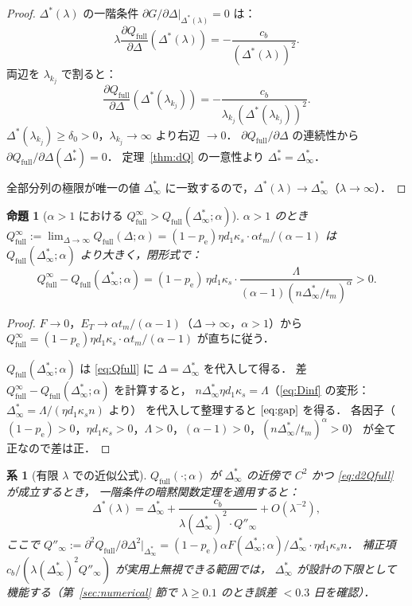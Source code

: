 \documentclass[12pt,a4paper]{article}
\theoremstyle{plain}
\newtheorem{proposition}[theorem]{命題}
\newtheorem{corollary}[theorem]{系}
\theoremstyle{definition}
\theoremstyle{remark}
\newcommand{\pe}{p_{\mathrm{e}}}
\newcommand{\Qf}{Q_{\mathrm{full}}}
\newcommand{\Dopt}{\Delta^{*}}
\newcommand{\Dinf}{\Delta^{*}_{\infty}}
\newcommand{\La}{\Lambda}
\begin{document}
\begin{proof}
$\Dopt(\lambda)$ の一階条件 $\partial G/\partial\Delta|_{\Dopt(\lambda)}=0$ は：
\[
\lambda\frac{\partial\Qf}{\partial\Delta}(\Dopt(\lambda))=-\frac{c_b}{(\Dopt(\lambda))^2}.
\]
両辺を $\lambda_{k_j}$ で割ると：
\[
\frac{\partial\Qf}{\partial\Delta}(\Dopt(\lambda_{k_j}))
=-\frac{c_b}{\lambda_{k_j}(\Dopt(\lambda_{k_j}))^2}.
\]
$\Dopt(\lambda_{k_j})\ge\delta_0>0$，$\lambda_{k_j}\to\infty$ より右辺 $\to0$．
$\partial\Qf/\partial\Delta$ の連続性から
$\partial\Qf/\partial\Delta(\Dopt_*)=0$．
定理~\ref{thm:dQ} の一意性より $\Dopt_*=\Dinf$．

全部分列の極限が唯一の値 $\Dinf$ に一致するので，$\Dopt(\lambda)\to\Dinf$（$\lambda\to\infty$）．
\end{proof}

\begin{proposition}[$\alpha>1$ における $\Qf^\infty>\Qf(\Dinf;\alpha)$]\label{prop:gap}
$\alpha>1$ のとき $\Qf^\infty:=\lim_{\Delta\to\infty}\Qf(\Delta;\alpha)=(1-\pe)\eta d_1\kappa_s\cdot\alpha t_m/(\alpha-1)$ は
$\Qf(\Dinf;\alpha)$ より大きく，閉形式で：
\begin{equation}\label{eq:gap}
\Qf^\infty-\Qf(\Dinf;\alpha)
=(1-\pe)\,\eta d_1\kappa_s\cdot\frac{\La}{(\alpha-1)(n\Dinf/t_m)^\alpha}>0.
\end{equation}
\end{proposition}

\begin{proof}
$F\to0$，$E_T\to\alpha t_m/(\alpha-1)$（$\Delta\to\infty$，$\alpha>1$）から
$\Qf^\infty=(1-\pe)\eta d_1\kappa_s\cdot\alpha t_m/(\alpha-1)$ が直ちに従う．

$\Qf(\Dinf;\alpha)$ は \eqref{eq:Qfull} に $\Delta=\Dinf$ を代入して得る．
差 $\Qf^\infty-\Qf(\Dinf;\alpha)$ を計算すると，
$n\Dinf\eta d_1\kappa_s=\La$（\eqref{eq:Dinf} の変形：$\Dinf=\La/(\eta d_1\kappa_s n)$ より）
を代入して整理すると $\eqref{eq:gap}$ を得る．
各因子（$(1-\pe)>0$，$\eta d_1\kappa_s>0$，$\La>0$，$(\alpha-1)>0$，$(n\Dinf/t_m)^\alpha>0$）
が全て正なので差は正．
\end{proof}

\begin{corollary}[有限 $\lambda$ での近似公式]\label{cor:taylor}
$\Qf(\cdot;\alpha)$ が $\Dinf$ の近傍で $C^2$ かつ \eqref{eq:d2Qfull} が成立するとき，
一階条件の暗黙関数定理を適用すると：
\begin{equation}\label{eq:taylor}
\Dopt(\lambda)=\Dinf+\frac{c_b}{\lambda(\Dinf)^2\cdot Q''_{\infty}}+O(\lambda^{-2}),
\end{equation}
ここで $Q''_{\infty}:=\partial^2\Qf/\partial\Delta^2|_{\Dinf}=(1-\pe)\alpha F(\Dinf;\alpha)/\Dinf\cdot\eta d_1\kappa_s n$．
補正項 $c_b/(\lambda(\Dinf)^2 Q''_{\infty})$ が実用上無視できる範囲では，
$\Dinf$ が設計の下限として機能する（第~\ref{sec:numerical} 節で $\lambda\ge0.1$ のとき誤差 $<0.3$ 日を確認）．
\end{corollary}
\end{document}
